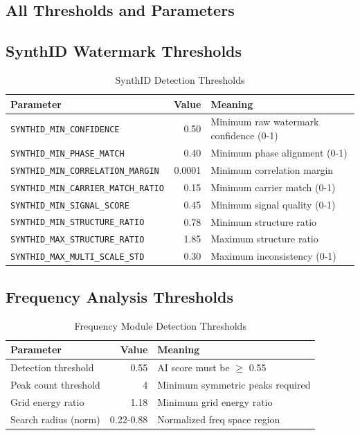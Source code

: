 \documentclass[12pt,a4paper]{book}
\begin{document}
\begin{itemize}
\chapter{All Thresholds and Parameters}
\label{ch:thresholds}

\section{SynthID Watermark Thresholds}

\begin{table}[H]
\centering
\captionsetup{justification=centering}
\caption{SynthID Detection Thresholds}
\begin{tabular}{|l|r|p{4cm}|}
\hline
\textbf{Parameter} & \textbf{Value} & \textbf{Meaning} \\
\hline
\texttt{SYNTHID\_MIN\_CONFIDENCE} & 0.50 & Minimum raw watermark confidence (0-1) \\
\hline
\texttt{SYNTHID\_MIN\_PHASE\_MATCH} & 0.40 & Minimum phase alignment (0-1) \\
\hline
\texttt{SYNTHID\_MIN\_CORRELATION\_MARGIN} & 0.0001 & Minimum correlation margin \\
\hline
\texttt{SYNTHID\_MIN\_CARRIER\_MATCH\_RATIO} & 0.15 & Minimum carrier match (0-1) \\
\hline
\texttt{SYNTHID\_MIN\_SIGNAL\_SCORE} & 0.45 & Minimum signal quality (0-1) \\
\hline
\texttt{SYNTHID\_MIN\_STRUCTURE\_RATIO} & 0.78 & Minimum structure ratio \\
\hline
\texttt{SYNTHID\_MAX\_STRUCTURE\_RATIO} & 1.85 & Maximum structure ratio \\
\hline
\texttt{SYNTHID\_MAX\_MULTI\_SCALE\_STD} & 0.30 & Maximum inconsistency (0-1) \\
\hline
\end{tabular}
\end{table}

\section{Frequency Analysis Thresholds}

\begin{table}[H]
\centering
\captionsetup{justification=centering}
\caption{Frequency Module Detection Thresholds}
\begin{tabular}{|l|r|p{4cm}|}
\hline
\textbf{Parameter} & \textbf{Value} & \textbf{Meaning} \\
\hline
Detection threshold & 0.55 & AI score must be $\geq$ 0.55 \\
\hline
Peak count threshold & 4 & Minimum symmetric peaks required \\
\hline
Grid energy ratio & 1.18 & Minimum grid energy ratio \\
\hline
Search radius (norm) & 0.22-0.88 & Normalized freq space region \\
\hline
\end{tabular}
\end{table}


\end{itemize}
\end{document}
